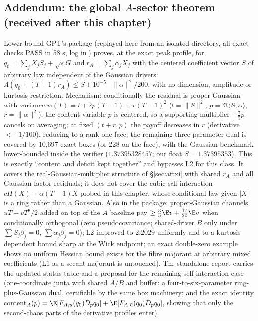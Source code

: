 \subsection{Addendum: the global $A$-sector theorem (received after this chapter)}
Lower-bound GPT's package  (replayed here from an isolated directory, all exact checks PASS in 58 s, log in ) proves, at
the exact peak profile, for $q_0=\sum_jX_jS_j+\sqrt sG$ and $r_A=\sum_j\alpha_jX_j$ with the centered coefficient vector $S$ of arbitrary law independent of the Gaussian drivers:
$\Lambda(q_0+(T-1)r_A)\le S+10^{-5}-\|\alpha\|^2/200$, with no dimension, amplitude or kurtosis restriction. Mechanism: conditionally the residual is proper Gaussian with variance
$w(T)=t+2p(T-1)+r(T-1)^2$ ($t=\|S\|^2$, $p=\Re\langle S,\alpha\rangle$, $r=\|\alpha\|^2$); the content variable $p$ is centered, so a supporting multiplier $-\frac75p$ cancels on
averaging; at fixed $(t+r,p)$ the payoff decreases in $r$ (derivative $<-1/100$), reducing to a rank-one face; the remaining three-parameter dual is covered by 10,697 exact boxes (or 228
on the face), with the Gaussian benchmark lower-bounded inside the verifier ($1.37395328457$; our float $S=1.37395353$). This is exactly ``content and deficit kept together'' and
bypasses L2 for this class. It covers the real-Gaussian-multiplier structure of \S\ref{sec:attxi} with shared $r_A$ and all Gaussian-factor residuals; it does not cover the cubic
self-interaction $cH(X)+\alpha(T-1)X$ probed in this chapter, whose conditional law given $|X|$ is a ring rather than a Gaussian. Also in the package: proper-Gaussian channels
$uT+vT^2/2$ added on top of the $A$ baseline pay $\ge\frac35\E u+\frac{17}{20}\E v$ when conditionally orthogonal (zero pseudocovariance; shared-driver $B$ only under
$\sum S_j\beta_j=0$, $\sum\alpha_j\beta_j=0$); L2 improved to $2.2029$ uniformly and to a kurtosis-dependent bound sharp at the Wick endpoint; an exact double-zero example shows no
uniform Hessian bound exists for the fibre majorant at arbitrary mixed coefficients (L1 as a secant majorant is untouched). The standalone report
 carries the updated status table and a proposal for the remaining self-interaction case (one-coordinate junta with shared
$A/B$ and buffer: a four-to-six-parameter ring-plus-Gaussian dual, certifiable by the same box machinery; and the exact identity content$_A(p)=\E[F_{A,u}(q_0)D_pq_0]+\E[F_{A,\bar u}(q_0)\overline{\bar D_pq_0}]$,
showing that only the second-chaos parts of the derivative profiles enter).


